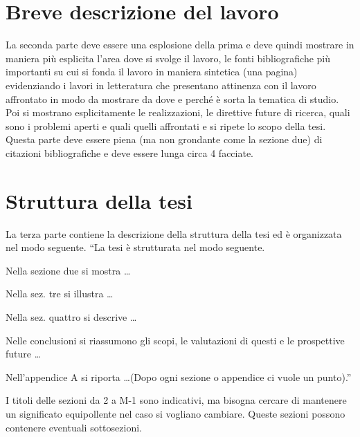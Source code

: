 \section{Breve descrizione del lavoro}
La seconda parte deve essere una esplosione della prima e deve quindi mostrare in maniera pi\`u esplicita l'area dove si svolge il lavoro, le fonti bibliografiche pi\`u importanti su cui si fonda il lavoro in maniera sintetica (una pagina) evidenziando i lavori in letteratura che presentano attinenza con il lavoro affrontato in modo da mostrare da dove e perch\'e \`e sorta la tematica di studio. Poi si mostrano esplicitamente le realizzazioni, le direttive future di ricerca, quali sono i problemi aperti e quali quelli affrontati e si ripete lo scopo della tesi. Questa parte deve essere piena (ma non grondante come la sezione due) di citazioni bibliografiche e deve essere lunga circa 4 facciate.

\section{Struttura della tesi}
La terza parte contiene la descrizione della struttura della tesi ed \`e organizzata nel modo seguente.
``La tesi \`e strutturata nel modo seguente.

Nella sezione due si mostra \dots

Nella sez. tre si illustra \dots

Nella sez. quattro si descrive \dots

Nelle conclusioni si riassumono gli scopi, le valutazioni di questi e le prospettive future \dots

Nell'appendice A si riporta \dots (Dopo ogni sezione o appendice ci vuole un punto).''

I titoli delle sezioni da 2 a M-1 sono indicativi, ma bisogna cercare di mantenere un significato equipollente nel caso si vogliano cambiare. Queste sezioni possono contenere eventuali sottosezioni.

